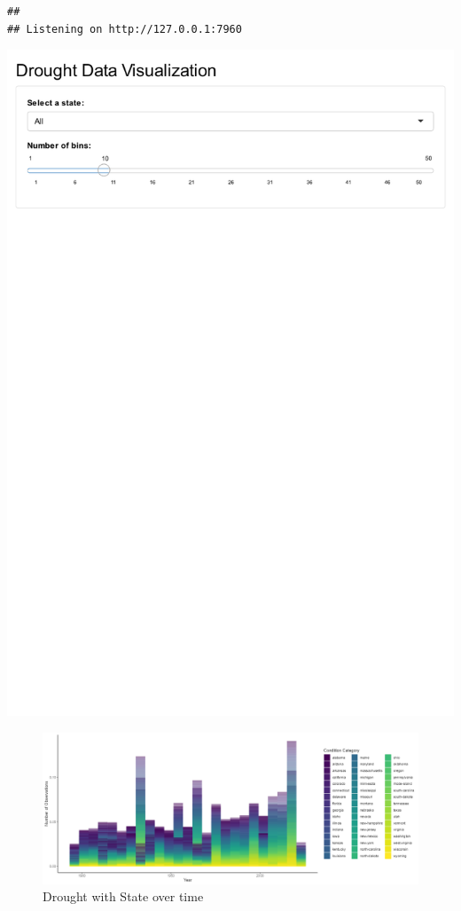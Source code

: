 \documentclass[
]{article}
\begin{document}
\begin{verbatim}
## 
## Listening on http://127.0.0.1:7960
\end{verbatim}

\includegraphics{C7083-213221-Markdown_files/figure-latex/Interactive plot of drought with state-1.pdf}

\begin{figure}
\includegraphics[width=1\linewidth]{../Images/Drought_Shiny} \caption{Drought with State over time}\label{fig:Figure 5-1}
\end{figure}
\end{document}
